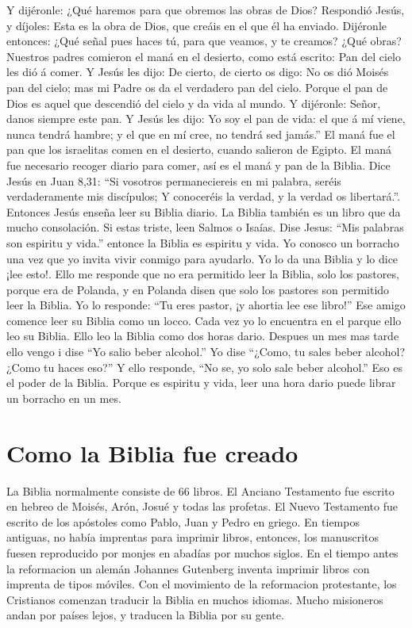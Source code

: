  Y dijéronle: ¿Qué haremos para que obremos las obras de
Dios?  Respondió Jesús, y díjoles: Esta es la obra de
Dios, que creáis en el que él ha enviado.  Dijéronle
entonces: ¿Qué señal pues haces tú, para que veamos, y te creamos? ¿Qué
obras?  Nuestros padres comieron el maná en el desierto,
como está escrito: Pan del cielo les dió á comer.  Y
Jesús les dijo: De cierto, de cierto os digo: No os dió Moisés pan del
cielo; mas mi Padre os da el verdadero pan del cielo. 
Porque el pan de Dios es aquel que descendió del cielo y da vida al
mundo.  Y dijéronle: Señor, danos siempre este pan.
 Y Jesús les dijo: Yo soy el pan de vida: el que á mí
viene, nunca tendrá hambre; y el que en mí cree, no tendrá sed jamás.''
El maná fue el pan que los israelitas comen en el desierto, cuando
salieron de Egipto. El maná fue necesario recoger diario para comer, así
es el maná y pan de la Biblia. Dice Jesús en Juan 8,31: ``Si vosotros
permaneciereis en mi palabra, seréis verdaderamente mis discípulos; Y
conoceréis la verdad, y la verdad os libertará.''. Entonces Jesús enseña
leer su Biblia diario. La Biblia también es un libro que da mucho
consolación. Si estas triste, leen Salmos o Isaías. Dise Jesus: ``Mis
palabras son espiritu y vida.'' entonce la Biblia es espiritu y vida. Yo
conosco un borracho una vez que yo invita vivir conmigo para ayudarlo.
Yo lo da una Biblia y lo dice ¡lee esto!. Ello me responde que no era
permitido leer la Biblia, solo los pastores, porque era de Polanda, y en
Polanda disen que solo los pastores son permitido leer la Biblia. Yo lo
responde: ``Tu eres pastor, ¡y ahortia lee ese libro!'' Ese amigo
comence leer su Biblia como un locco. Cada vez yo lo encuentra en el
parque ello leo su Biblia. Ello leo la Biblia como dos horas dario.
Despues un mes mas tarde ello vengo i dise ``Yo salio beber alcohol.''
Yo dise ``¿Como, tu sales beber alcohol? ¿Como tu haces eso?'' Y ello
responde, ``No se, yo solo sale beber alcohol.'' Eso es el poder de la
Biblia. Porque es espiritu y vida, leer una hora dario puede librar un
borracho en un mes.

\hypertarget{como-la-biblia-fue-creado}{%
\section{Como la Biblia fue creado}\label{como-la-biblia-fue-creado}}

La Biblia normalmente consiste de 66 libros. El Anciano Testamento fue
escrito en hebreo de Moisés, Arón, Josué y todas las profetas. El Nuevo
Testamento fue escrito de los apóstoles como Pablo, Juan y Pedro en
griego. En tiempos antiguas, no había imprentas para imprimir libros,
entonces, los manuscritos fuesen reproducido por monjes en abadías por
muchos siglos. En el tiempo antes la reformacion un alemán Johannes
Gutenberg inventa imprimir libros con imprenta de tipos móviles. Con el
movimiento de la reformacion protestante, los Cristianos comenzan
traducir la Biblia en muchos idiomas. Mucho misioneros andan por países
lejos, y traducen la Biblia por su gente.

